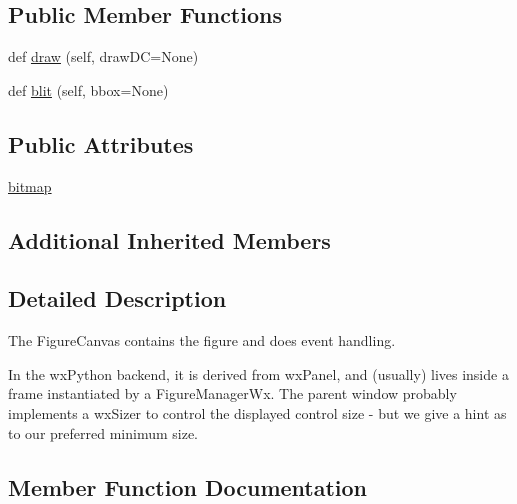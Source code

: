 \subsection*{Public Member Functions}
\begin{DoxyCompactItemize}
\item 
def \hyperlink{classmatplotlib_1_1backends_1_1backend__wxagg_1_1FigureCanvasWxAgg_a8463d41ab866aed4b439004d6360e8d5}{draw} (self, draw\+DC=None)
\item 
def \hyperlink{classmatplotlib_1_1backends_1_1backend__wxagg_1_1FigureCanvasWxAgg_aa063598c7fb8b3db2244ddb845134c1e}{blit} (self, bbox=None)
\end{DoxyCompactItemize}
\subsection*{Public Attributes}
\begin{DoxyCompactItemize}
\item 
\hyperlink{classmatplotlib_1_1backends_1_1backend__wxagg_1_1FigureCanvasWxAgg_abb3f99337e2ae4711a4413c865e2568e}{bitmap}
\end{DoxyCompactItemize}
\subsection*{Additional Inherited Members}


\subsection{Detailed Description}
\begin{DoxyVerb}The FigureCanvas contains the figure and does event handling.

In the wxPython backend, it is derived from wxPanel, and (usually)
lives inside a frame instantiated by a FigureManagerWx. The parent
window probably implements a wxSizer to control the displayed
control size - but we give a hint as to our preferred minimum
size.
\end{DoxyVerb}
 

\subsection{Member Function Documentation}
\mbox{\label{classmatplotlib_1_1backends_1_1backend__wxagg_1_1FigureCanvasWxAgg_aa063598c7fb8b3db2244ddb845134c1e}} 
